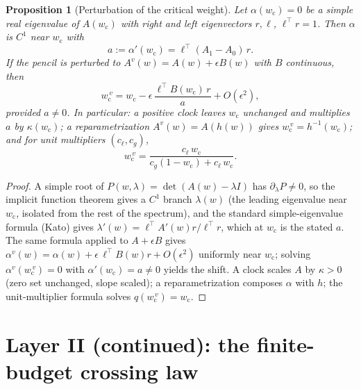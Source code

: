 \documentclass[11pt]{article}
\newtheorem{proposition}{Proposition}
\theoremstyle{definition}
\theoremstyle{remark}
\newcommand{\wcrit}{w_{\mathrm c}}
\begin{document}
\begin{proposition}[Perturbation of the critical weight]\label{p2}
Let $\alpha(\wcrit)=0$ be a simple real eigenvalue of $A(\wcrit)$ with right and left eigenvectors $r,\ell$, $\ell^\top r=1$. Then $\alpha$ is $C^1$ near $\wcrit$ with
\[
a:=\alpha'(\wcrit)=\ell^\top(A_1-A_0)\,r .
\]
If the pencil is perturbed to $A^v(w)=A(w)+\epsilon B(w)$ with $B$ continuous, then
\[
\wcrit^{\,v}=\wcrit-\epsilon\,\frac{\ell^\top B(\wcrit)\,r}{a}+O(\epsilon^2),
\]
provided $a\neq0$. In particular: a positive clock leaves $\wcrit$ unchanged and multiplies $a$ by $\kappa(\wcrit)$; a reparametrization $A^v(w)=A(h(w))$ gives $\wcrit^{\,v}=h^{-1}(\wcrit)$; and for unit multipliers $(c_\ell,c_g)$,
\[
\wcrit^{\,v}=\frac{c_\ell\,\wcrit}{c_g(1-\wcrit)+c_\ell\,\wcrit}.
\]
\end{proposition}
\begin{proof}
A simple root of $P(w,\lambda)=\det(A(w)-\lambda I)$ has $\partial_\lambda P\ne0$, so the implicit function theorem gives a $C^1$ branch $\lambda(w)$ (the leading eigenvalue near $\wcrit$, isolated from the rest of the spectrum), and the standard simple-eigenvalue formula (Kato) gives $\lambda'(w)=\ell^\top A'(w)r/\ell^\top r$, which at $\wcrit$ is the stated $a$. The same formula applied to $A+\epsilon B$ gives $\alpha^v(w)=\alpha(w)+\epsilon\,\ell^\top B(w)r+O(\epsilon^2)$ uniformly near $\wcrit$; solving $\alpha^v(\wcrit^{\,v})=0$ with $\alpha'(\wcrit)=a\ne0$ yields the shift. A clock scales $A$ by $\kappa>0$ (zero set unchanged, slope scaled); a reparametrization composes $\alpha$ with $h$; the unit-multiplier formula solves $q(\wcrit^{\,v})=\wcrit$.
\end{proof}

\section{Layer II (continued): the finite-budget crossing law}
\end{document}
